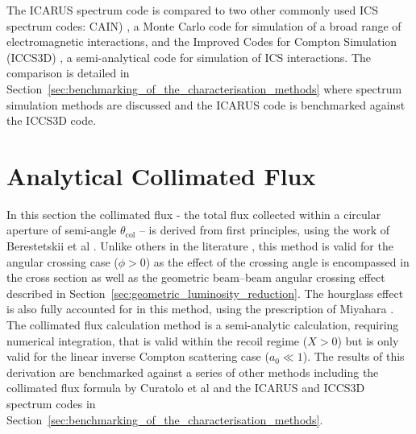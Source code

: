 \documentclass[../main.tex]{subfiles}
\begin{document}
The \textsc{ICARUS} spectrum code is compared to two other commonly used ICS spectrum codes: \textsc{CAIN}) \cite{chen1995cain}, a Monte Carlo code for simulation of a broad range of electromagnetic interactions, and the Improved Codes for Compton Simulation (\textsc{ICCS3D}) \cite{krafft2016laser,ranjan2018simulation}, a semi-analytical code for simulation of ICS interactions. The comparison is detailed in Section~\ref{sec:benchmarking_of_the_characterisation_methods} where spectrum simulation methods are discussed and the \textsc{ICARUS} code is benchmarked against the \textsc{ICCS3D} code.

\section{Analytical Collimated Flux}
\label{sec:analytical_collimated_flux}

In this section the collimated flux - the total flux collected within a circular aperture of semi-angle $\theta_{\mathrm{col}}$ -- is derived from first principles, using the work of Berestetskii et al \cite{berestetskii1982quantum}. Unlike others in the literature \cite{curatolo2017analytical}, this method is valid for the angular crossing case ($\phi>0$) as the effect of the crossing angle is encompassed in the cross section as well as the geometric beam--beam angular crossing effect described in Section~\ref{sec:geometric_luminosity_reduction}. The hourglass effect is also fully accounted for in this method, using the prescription of Miyahara \cite{miyahara2008luminosity}. The collimated flux calculation method is a semi-analytic calculation, requiring numerical integration, that is valid within the recoil regime ($X>0$) but is only valid for the linear inverse Compton scattering case ($a_{0}\ll1$). The results of this derivation are benchmarked against a series of other methods including the collimated flux formula by Curatolo et al \cite{curatolo2017analytical} and the \textsc{ICARUS} and \textsc{ICCS3D} spectrum codes in Section~\ref{sec:benchmarking_of_the_characterisation_methods}.
\end{document}
